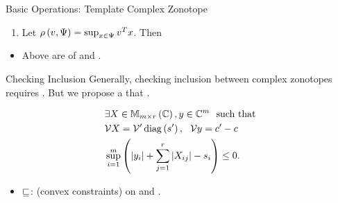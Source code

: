 %
\begin{frame}{Basic Operations: Template Complex Zonotope}
%
\begin{enumerate}
\item {\small Let $\rho\left(v,\Psi\right)=\sup_{x\in\Psi}v^Tx$}. Then \\
\eqnemph{
\[
\supp{v}{\real\lt(\tcztope{\ptemp}{\cen}{\sfact}\rt)}=v^Tc+\absolute{v^T\ptemp}\sfact.
\]
}
\end{enumerate}
%
\begin{itemize}
\item Above are  of 
and .
\end{itemize}
%
\end{frame}
%
\begin{frame}{Checking Inclusion}
Generally, checking inclusion between complex zonotopes requires .
But we propose a  that  .\\[0.5em]
%
{\small 
%
\begin{definition}[\eqnemph{$\tcztope{\ptemp^\pr}{\cen^\pr}{\sfact^\pr}\order\tcztope{\ptemp}{\cen}{\sfact}$}]
%
\vspace{-1em}
\begin{align*}
& \exists \tmat\in\mat{m}{r}{\compnums},\tvect\in\compnums^m~~\text{such
that}\\
& \ptemp\tmat=\ptemp^\pr\diagonal{\sfact^\pr},~~\ptemp\tvect=\cen^\pr-\cen~\\%
& \max_{i=1}^m\lt(\absolute{\tvect_i}+\sum_{j=1}^r\absolute{\tmat_{ij}}-\sfact_i\rt)\leq
0.
\end{align*}
%
\end{definition}
}
\vspace{0.3em}
\begin{minipage}{0.37\textwidth}
\begin{exampleblock}{}
\end{exampleblock}
\end{minipage}
%
\begin{minipage}{0.6\textwidth}
\begin{itemize}
\item $\sqsubseteq$:  (convex
constraints) on  and .
\end{itemize}
\end{minipage}
%
\end{frame}
%







